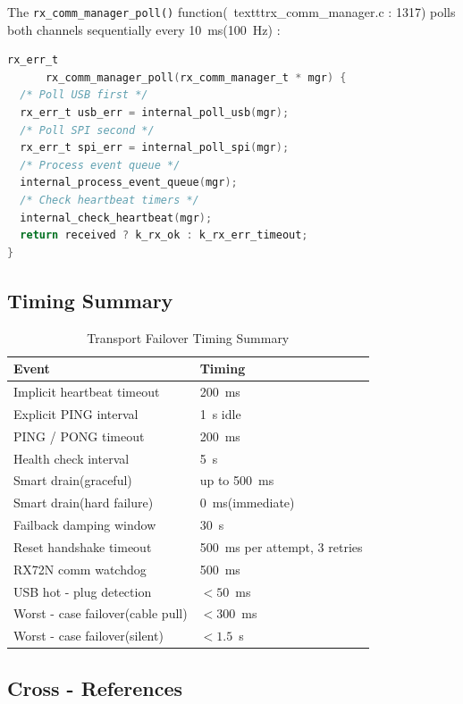     The \texttt{rx\_comm\_manager\_poll()} function(\
        texttt{rx\_comm\_manager.c : 1317})
        polls both channels sequentially every 10\,
    ms(100\, Hz)
    :

\begin{lstlisting}[language = C,
                    caption = {RX72N Dual - Channel Polling}] rx_err_t
      rx_comm_manager_poll(rx_comm_manager_t * mgr) {
  /* Poll USB first */
  rx_err_t usb_err = internal_poll_usb(mgr);
  /* Poll SPI second */
  rx_err_t spi_err = internal_poll_spi(mgr);
  /* Process event queue */
  internal_process_event_queue(mgr);
  /* Check heartbeat timers */
  internal_check_heartbeat(mgr);
  return received ? k_rx_ok : k_rx_err_timeout;
}
\end{lstlisting}

\subsection{Timing Summary}

\begin{table}[H]
\centering
\caption { Transport Failover Timing Summary}
\label {
tab:
  failover - timing - summary
}
\begin{tabular} { l l}
\toprule
\textbf{Event} & \textbf{Timing}
\\
\midrule Implicit heartbeat timeout & 200\, ms \\
Explicit PING interval & 1\,
    s idle \\
PING / PONG timeout & 200\, ms \\
Health check interval & 5\,
    s \\
Smart drain(graceful) & up to 500\, ms \\
Smart drain(hard failure) & 0\,
    ms(immediate) \\
Failback damping window & 30\,
    s \\
Reset handshake timeout & 500\, ms per attempt,
    3 retries \\
RX72N comm watchdog & 500\,
    ms \\
USB hot - plug detection &$ < 50 $\,
    ms \\
Worst - case failover(cable pull) & $ < 300 $\,
    ms \\
Worst - case failover(silent) & $ < 1.5 $\,
    s \\
\bottomrule
\end{tabular}
\end{table}

\subsection{Cross - References}

